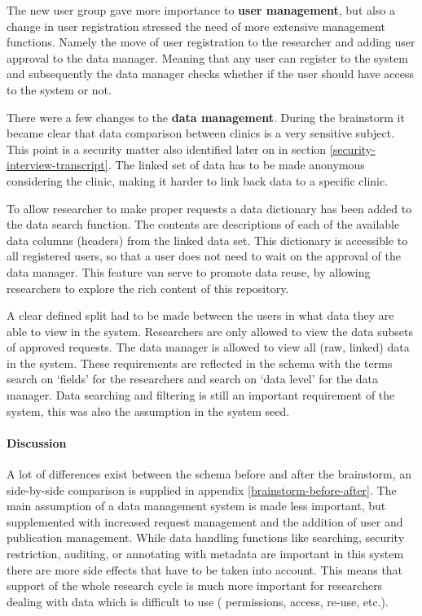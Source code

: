 The new user group gave more importance to \textbf{user management}, but also a change in user registration stressed the need of more extensive management functions.
Namely the move of user registration to the researcher and adding user approval to the data manager.
Meaning that any user can register to the system and subsequently the data manager checks whether if the user should have access to the system or not.

There were a few changes to the \textbf{data management}.
During the brainstorm it became clear that data comparison between clinics is a very sensitive subject.
This point is a security matter also identified later on in section \ref{security-interview-transcript}.
The linked set of data has to be made anonymous considering the clinic, making it harder to link back data to a specific clinic.

To allow researcher to make proper requests a data dictionary has been added to the data search function.
The contents are descriptions of each of the available data columns (headers) from the linked data set.
This dictionary is accessible to all registered users, so that a user does not need to wait on the approval of the data manager. 
This feature van serve to promote data reuse, by allowing researchers to explore the rich content of this repository.

A clear defined split had to be made between the users in what data they are able to view in the system.
Researchers are only allowed to view the data subsets of approved requests.
The data manager is allowed to view all (raw, linked) data in the system.
These requirements are reflected in the schema with the terms search on `fields' for the researchers and search on `data level' for the data manager.
Data searching and filtering is still an important requirement of the system, this was also the assumption in the system seed.

\paragraph{Discussion}

A lot of differences exist between the schema before and after the brainstorm, an side-by-side comparison is supplied in appendix \ref{brainstorm-before-after}.
The main assumption of a data management system is made less important, but supplemented with increased request management and the addition of user and publication management.
While data handling functions like searching, security restriction, auditing, or annotating with metadata are important in this system there are more side effects that have to be taken into account.
This means that support of the whole research cycle is much more important for researchers dealing with data which is difficult to use (\ie{} permissions, access, re-use, etc.).


